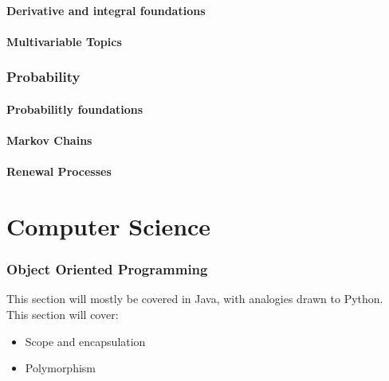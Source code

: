 \documentclass[10pt,a4paper,fleqn]{article} %
\begin{document}
\subsection{Derivative and integral foundations} %

\subsection{Multivariable Topics} %


\section{Probability} %

\subsection{Probabilitly foundations} %

\subsection{Markov Chains} %

\subsection{Renewal Processes} %

\newpage

\part{Computer Science}

\section{Object Oriented Programming} %
This section will mostly be covered in Java, with analogies drawn to Python. 
This section will cover:
\begin{itemize}
    \item Scope and encapsulation
    \item Polymorphism
\end{itemize}
\end{document}
